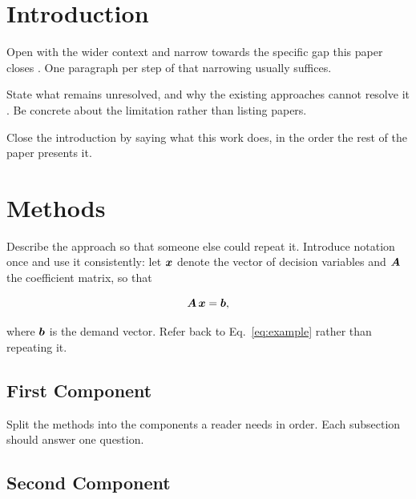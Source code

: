 \documentclass[12pt,a4paper]{article}
\begin{document}
\newpage

\tableofcontents
\newpage


\section{Introduction}

Open with the wider context and narrow towards the specific gap this paper
closes \cite{firstReference2024, secondReference2023}. One paragraph per step of
that narrowing usually suffices.

State what remains unresolved, and why the existing approaches cannot resolve it
\cite{thirdReference2022}. Be concrete about the limitation rather than listing
papers.

Close the introduction by saying what this work does, in the order the rest of
the paper presents it.


\section{Methods} \label{sec:methods}

Describe the approach so that someone else could repeat it. Introduce notation
once and use it consistently: let $\vectorsym{x}$ denote the vector of decision
variables and $\matrixsym{A}$ the coefficient matrix, so that

\begin{equation} \label{eq:example}
    \matrixsym{A} \, \vectorsym{x} = \vectorsym{b},
\end{equation}

where $\vectorsym{b}$ is the demand vector. Refer back to
Eq.~\ref{eq:example} rather than repeating it.

\subsection{First Component} \label{sec:first_component}

Split the methods into the components a reader needs in order. Each subsection
should answer one question.

\subsection{Second Component}
\end{document}
